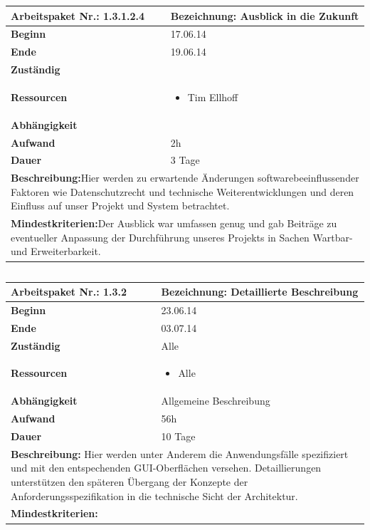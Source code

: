 \documentclass[fontsize=12pt,paper=a4,twoside]{scrartcl}
\begin{document}
\begin{tabular}{|p{5.3cm}|p{9.7cm}|}\hline
	\textbf{Arbeitspaket Nr.:} 1.3.1.2.4 & \textbf{Bezeichnung:} Ausblick in die Zukunft\\ \hline \hline
	\textbf{Beginn} & 17.06.14\\ \hline
	\textbf{Ende} & 19.06.14\\ \hline
	\textbf{Zuständig} & \\ \hline
	\textbf{Ressourcen} & \begin{itemize}
		\item Tim Ellhoff 
	\end{itemize}    \\ \hline
	\textbf{Abhängigkeit} &\\ \hline
	\textbf{Aufwand} & 2h\\ \hline
	\textbf{Dauer} & 3 Tage\\ \hline
	\multicolumn{2}{|p{15cm}|}{\textbf{Beschreibung:}\newline Hier werden zu erwartende Änderungen softwarebeeinflussender Faktoren wie Datenschutzrecht und technische Weiterentwicklungen und deren Einfluss auf unser Projekt und System betrachtet. }\\ \hline
	\multicolumn{2}{|p{15cm}|}{\textbf{Mindestkriterien:}\newline Der Ausblick war umfassen genug und gab Beiträge zu eventueller Anpassung der Durchführung unseres Projekts in Sachen Wartbar- und Erweiterbarkeit. }\\ \hline
\end{tabular}

\begin{verbatim} 
\end{verbatim}

\begin{tabular}{|p{5.3cm}|p{9.7cm}|}\hline
	\textbf{Arbeitspaket Nr.:} 1.3.2 & \textbf{Bezeichnung:} Detaillierte Beschreibung\\ \hline \hline
	\textbf{Beginn} & 23.06.14\\ \hline
	\textbf{Ende} & 03.07.14\\ \hline
	\textbf{Zuständig} & Alle\\ \hline
	\textbf{Ressourcen} & \begin{itemize}
		\item Alle
	\end{itemize}    \\ \hline
	\textbf{Abhängigkeit} & Allgemeine Beschreibung\\ \hline
	\textbf{Aufwand} & 56h\\ \hline
	\textbf{Dauer} & 10 Tage\\ \hline
	\multicolumn{2}{|p{15cm}|}{\textbf{Beschreibung:} Hier werden unter Anderem die Anwendungsfälle spezifiziert und mit den entspechenden GUI-Oberflächen versehen. 
		Detaillierungen unterstützen den späteren Übergang der Konzepte der Anforderungsspezifikation in die technische Sicht der Architektur.\newline  }\\ \hline
	\multicolumn{2}{|p{15cm}|}{\textbf{Mindestkriterien:}\newline  }\\ \hline
\end{tabular}
\end{document}

